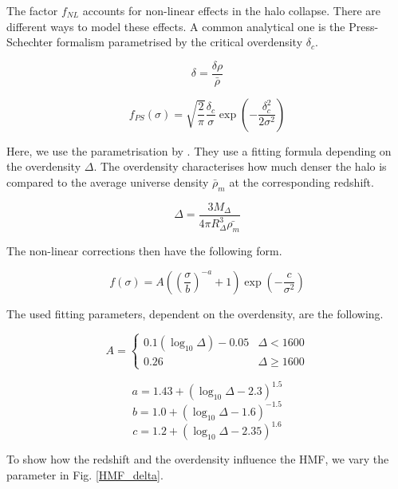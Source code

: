 The factor $f_{NL}$ accounts for non-linear effects in the halo collapse. There are different ways to model these effects. A common analytical one is the Press-Schechter formalism parametrised by the critical overdensity $\delta_c$.

\begin{equation}
    \delta = \frac{\delta \rho}{\bar{\rho}}
\end{equation}

\begin{equation}
    f_{PS}(\sigma)=\sqrt{\frac{2}{\pi}} \frac{\delta_c}{\sigma}\exp(-\frac{\delta_c^2}{2\sigma^2})
\end{equation}

Here, we use the parametrisation by \cite{tinker_toward_2008}. They use a fitting formula depending on the overdensity $\Delta$. The overdensity characterises how much denser the halo is compared to the average universe density $\bar{\rho}_m$ at the corresponding redshift.

\begin{equation}
    \Delta = \frac{3M_{\Delta}}{4\pi R^3_{\Delta}\bar{\rho_m}}
\end{equation}

The non-linear corrections then have the following form.

\begin{equation}
    f(\sigma)=A \left( \left(\frac{\sigma}{b}\right)^{-a}+1\right)\exp(-\frac{c}{\sigma^2})
\end{equation}

The used fitting parameters, dependent on the overdensity, are the following.

\[ A = \begin{cases}
    0.1(\log_{10}\Delta)-0.05 & \Delta<1600 \\
    0.26 & \Delta \geq 1600
\end{cases}
\]

\begin{equation}
    a=1.43+(\log_{10}\Delta -2.3)^{1.5}
\end{equation}
\begin{equation}
    b=1.0+(\log_{10}\Delta -1.6)^{-1.5}
\end{equation}
\begin{equation}
    c=1.2+(\log_{10}\Delta -2.35)^{1.6}
\end{equation}

To show how the redshift and the overdensity influence the HMF, we vary the parameter in Fig. \ref{HMF_delta}.

